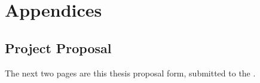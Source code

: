 \chapter{Appendices}
\label{chap:appendices}

\section{Project Proposal}
\label{sec:appendices_proposal}

The next two pages are this thesis proposal form, submitted to the .

